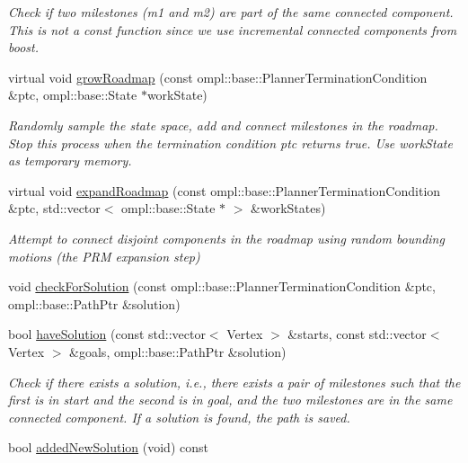 \begin{DoxyCompactItemize}
\begin{DoxyCompactList}\small\item\em \-Check if two milestones ({\itshape m1\/} and {\itshape m2\/}) are part of the same connected component. \-This is not a const function since we use incremental connected components from boost. \end{DoxyCompactList}\item 
\hypertarget{class_f_i_r_m_ae33b03b6c78466e4a47f7b6d9f59d7f8}{virtual void \hyperlink{class_f_i_r_m_ae33b03b6c78466e4a47f7b6d9f59d7f8}{grow\-Roadmap} (const ompl\-::base\-::\-Planner\-Termination\-Condition \&ptc, ompl\-::base\-::\-State $\ast$work\-State)}\label{class_f_i_r_m_ae33b03b6c78466e4a47f7b6d9f59d7f8}

\begin{DoxyCompactList}\small\item\em \-Randomly sample the state space, add and connect milestones in the roadmap. \-Stop this process when the termination condition {\itshape ptc\/} returns true. \-Use {\itshape work\-State\/} as temporary memory. \end{DoxyCompactList}\item 
virtual void \hyperlink{class_f_i_r_m_ab0c4511064a0cd59f5b5ad756879c4ef}{expand\-Roadmap} (const ompl\-::base\-::\-Planner\-Termination\-Condition \&ptc, std\-::vector$<$ ompl\-::base\-::\-State $\ast$ $>$ \&work\-States)
\begin{DoxyCompactList}\small\item\em \-Attempt to connect disjoint components in the roadmap using random bounding motions (the \-P\-R\-M expansion step) \end{DoxyCompactList}\item 
void \hyperlink{class_f_i_r_m_a4c909fc53ceeeecb6992ccebf0ab60d6}{check\-For\-Solution} (const ompl\-::base\-::\-Planner\-Termination\-Condition \&ptc, ompl\-::base\-::\-Path\-Ptr \&solution)
\item 
\hypertarget{class_f_i_r_m_ab237fb0d7978ef4156769fc7c1d77b2b}{bool \hyperlink{class_f_i_r_m_ab237fb0d7978ef4156769fc7c1d77b2b}{have\-Solution} (const std\-::vector$<$ \-Vertex $>$ \&starts, const std\-::vector$<$ \-Vertex $>$ \&goals, ompl\-::base\-::\-Path\-Ptr \&solution)}\label{class_f_i_r_m_ab237fb0d7978ef4156769fc7c1d77b2b}

\begin{DoxyCompactList}\small\item\em \-Check if there exists a solution, i.\-e., there exists a pair of milestones such that the first is in {\itshape start\/} and the second is in {\itshape goal\/}, and the two milestones are in the same connected component. \-If a solution is found, the path is saved. \end{DoxyCompactList}\item 
\hypertarget{class_f_i_r_m_a341a81deb4e550fbacf6c239a801d2a8}{bool \hyperlink{class_f_i_r_m_a341a81deb4e550fbacf6c239a801d2a8}{added\-New\-Solution} (void) const }\label{class_f_i_r_m_a341a81deb4e550fbacf6c239a801d2a8}


\end{DoxyCompactItemize}
